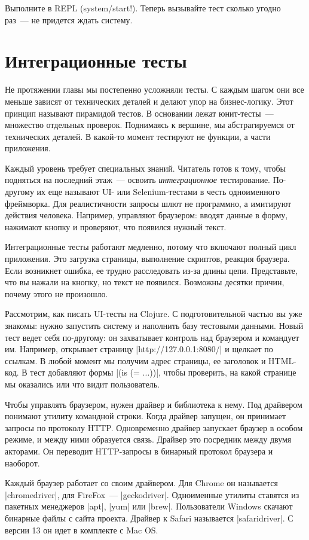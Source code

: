 Выполните в REPL (system/start!). Теперь вызывайте тест сколько угодно раз~---
не придется ждать систему.

\section{Интеграционные тесты}

Не протяжении главы мы постепенно усложняли тесты. С каждым шагом они все меньше
зависят от технических деталей и делают упор на бизнес-логику. Этот принцип
называют пирамидой тестов. В основании лежат юнит-тесты~--- множество отдельных
проверок. Поднимаясь к вершине, мы абстрагируемся от технических деталей. В
какой-то момент тестируют не функции, а части приложения.

Каждый уровень требует специальных знаний. Читатель готов к тому, чтобы
подняться на последний этаж~--- освоить \emph{интеграционное}
тестирование. По-другому их еще называют UI- или Selenium-тестами в честь
одноименного фреймворка. Для реалистичности запросы шлют не программно, а
имитируют действия человека. Например, управляют браузером: вводят данные в
форму, нажимают кнопку и проверяют, что появился нужный текст.

Интеграционные тесты работают медленно, потому что включают полный цикл
приложения. Это загрузка страницы, выполнение скриптов, реакция браузера. Если
возникнет ошибка, ее трудно расследовать из-за длины цепи. Представьте, что вы
нажали на кнопку, но текст не появился. Возможны десятки причин, почему этого не
произошло.

Рассмотрим, как писать UI-тесты на Clojure. С подготовительной частью вы уже
знакомы: нужно запустить систему и наполнить базу тестовыми данными. Новый тест
ведет себя по-другому: он захватывает контроль над браузером и командует
им. Например, открывает страницу \spverb|http://127.0.0.1:8080/| и щелкает по
ссылкам. В любой момент мы получим адрес страницы, ее заголовок и HTML-код. В
тест добавляют формы \spverb|(is (= ...))|, чтобы проверить, на какой странице
мы оказались или что видит пользователь.

Чтобы управлять браузером, нужен драйвер и библиотека к нему. Под драйвером
понимают утилиту командной строки. Когда драйвер запущен, он принимает запросы
по протоколу HTTP. Одновременно драйвер запускает браузер в особом режиме, и
между ними образуется связь. Драйвер это посредник между двумя акторами. Он
переводит HTTP-запросы в бинарный протокол браузера и наоборот.

Каждый браузер работает со своим драйвером. Для Chrome он называется
\spverb|chromedriver|, для FireFox~--- \spverb|geckodriver|. Одноименные утилиты
ставятся из пакетных менеджеров \spverb|apt|, \spverb|yum| или
\spverb|brew|. Пользователи Windows скачают бинарные файлы с сайта
проекта. Драйвер к Safari называется \spverb|safaridriver|. С версии 13 он идет
в комплекте с Mac OS.

